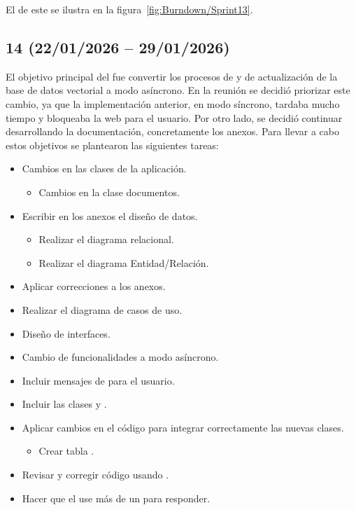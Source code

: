 El  de este  se ilustra en la figura~\ref{fig:Burndown/Sprint13}.

\subsection{ 14 (22/01/2026 -- 29/01/2026)}

El objetivo principal del  fue convertir los procesos de  y de actualización de la base de datos vectorial a modo asíncrono. En la reunión se decidió priorizar este cambio, ya que la implementación anterior, en modo síncrono, tardaba mucho tiempo y bloqueaba la web para el usuario. Por otro lado, se decidió continuar desarrollando la documentación, concretamente los anexos. Para llevar a cabo estos objetivos se plantearon las siguientes tareas:
\begin{itemize}
\tightlist
	\item Cambios en las clases de la aplicación.
	\begin{itemize}
	\tightlist
		\item Cambios en la clase documentos.
	\end{itemize} 
	\item Escribir en los anexos el diseño de datos.
	\begin{itemize}
	\tightlist
		\item Realizar el diagrama relacional.
		\item Realizar el diagrama Entidad/Relación.
	\end{itemize}
	\item Aplicar correcciones a los anexos.
	\item Realizar el diagrama de casos de uso.
	\item Diseño de interfaces.
	\item Cambio de funcionalidades a modo asíncrono.
	\item Incluir mensajes de  para el usuario.
	\item Incluir las clases  y .
	\item Aplicar cambios en el código para integrar correctamente las nuevas clases.
	\begin{itemize}
	\tightlist
		\item Crear tabla .
	\end{itemize}
	\item Revisar y corregir código usando .
	\item Hacer que el  use más de un  para responder.
\end{itemize}

